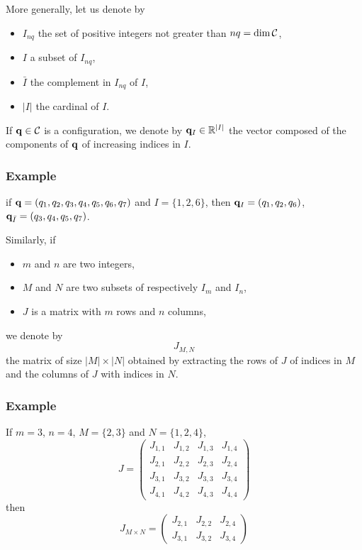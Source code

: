 More generally, let us denote by
\begin {itemize}
\item $I_{nq}$ the set of positive integers not greater than $nq=\dim\mathcal{C}$,
\item $I$ a subset of $I_{nq}$,
\item $\bar{I}$ the complement in $I_{nq}$ of $I$,
\item $|I|$ the cardinal of $I$.
\end {itemize}
If $\mathbf{q}\in\mathcal{C}$ is a configuration, we denote by $\mathbf{q}_{I}\in\mathbb{R}^{|I|}$ the vector composed of the components of $\mathbf{q}$ of increasing indices in $I$.
\subsubsection {Example} if $\mathbf{q} = (q_1,q_2,q_3,q_4,q_5,q_6,q_7)$ and $I=\{1,2,6\}$, then $\mathbf{q}_I=(q_1,q_2,q_6)$, $\mathbf{q}_{\bar{I}}=(q_3,q_4,q_5,q_7)$.

Similarly, if
\begin{itemize}
\item $m$ and $n$ are two integers,
\item $M$ and $N$ are two subsets of respectively $I_{m}$ and $I_{n}$,
\item $J$ is a matrix with $m$ rows and $n$ columns,
\end{itemize}
we denote by
\begin{equation}\label{eq:sub-matrix}
  J_{M,N}
\end{equation}
the matrix of size $|M| \times |N|$ obtained by extracting the rows of $J$ of indices in $M$ and the columns of $J$ with indices in $N$.

\subsubsection{Example}
If $m=3$, $n=4$, $M=\{2,3\}$ and $N=\{1,2,4\}$,
$$
J = \left(\begin{array}{cccc}
  J_{1,1} &   J_{1,2} &   J_{1,3} &   J_{1,4}\\
  J_{2,1} &   J_{2,2} &   J_{2,3} &   J_{2,4}\\
  J_{3,1} &   J_{3,2} &   J_{3,3} &   J_{3,4}\\
  J_{4,1} &   J_{4,2} &   J_{4,3} &   J_{4,4}
\end{array}\right)
$$
then
$$
J_{M\times N} = \left(\begin{array}{ccc}
  J_{2,1} &   J_{2,2} &   J_{2,4}\\
  J_{3,1} &   J_{3,2} &   J_{3,4}
\end{array}\right)
$$
  
